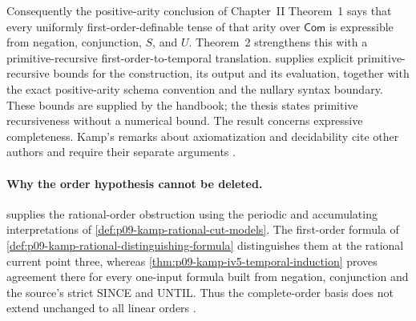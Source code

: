 Consequently the positive-arity conclusion of Chapter~II Theorem~1
says that every uniformly first-order-definable tense of that arity
over \(\mathsf{Com}\) is expressible from
negation, conjunction, \(S\), and \(U\).  Theorem~2 strengthens this with a
primitive-recursive first-order-to-temporal translation.
 supplies explicit
primitive-recursive bounds for the construction, its output and its
evaluation, together with the exact positive-arity schema convention
and the nullary syntax boundary. These bounds are supplied by the
handbook; the thesis states primitive recursiveness without a numerical
bound. The result concerns expressive completeness. Kamp's remarks
about axiomatization and decidability cite other authors and require
their separate arguments
\cite[ch.~I, p.~14; ch.~II, pp.~27--29]{Kamp1968}.




\paragraph{Why the order hypothesis cannot be deleted.}
 supplies the rational-order obstruction using
the periodic and accumulating interpretations of
\cref{def:p09-kamp-rational-cut-models}.
The first-order formula of
\cref{def:p09-kamp-rational-distinguishing-formula} distinguishes them
at the rational current point three, whereas
\cref{thm:p09-kamp-iv5-temporal-induction} proves agreement there
for every one-input formula built from negation, conjunction and
the source's strict SINCE and UNTIL.
Thus the complete-order basis does not extend unchanged to all
linear orders \cite[ch.~IV, pp.~109--112]{Kamp1968}.

